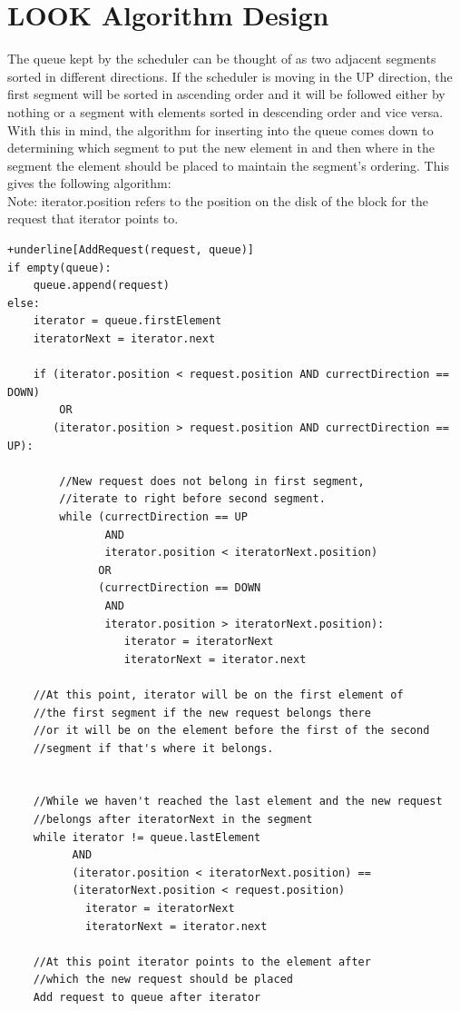 \documentclass[onecolumn,draftclsnofoot, 10pt, compsoc]{IEEEtran}
\begin{document}
\section{LOOK Algorithm Design}
	The queue kept by the scheduler can be thought of as two adjacent segments sorted in different directions. 
	If the scheduler is moving in the UP direction, the first segment will be sorted in ascending order and it will be followed either by nothing or a segment with elements sorted in descending order and vice versa.
	With this in mind, the algorithm for inserting into the queue comes down to determining which segment to put the new element in and then where in the segment the element should be placed to maintain the segment's ordering.
	This gives the following algorithm: \\

	Note: iterator.position refers to the position on the disk of the block for the request that iterator points to.

\begin{Verbatim}[commandchars=+\[\]]
+underline[AddRequest(request, queue)]
if empty(queue):
	queue.append(request)
else:
	iterator = queue.firstElement
	iteratorNext = iterator.next

	if (iterator.position < request.position AND currectDirection == DOWN)
		OR
	   (iterator.position > request.position AND currectDirection == UP):

		//New request does not belong in first segment, 
		//iterate to right before second segment.
		while (currectDirection == UP 
			   AND 
			   iterator.position < iteratorNext.position)
			  OR
			  (currectDirection == DOWN 
			   AND 
			   iterator.position > iteratorNext.position):
				  iterator = iteratorNext
				  iteratorNext = iterator.next

	//At this point, iterator will be on the first element of 
	//the first segment if the new request belongs there
	//or it will be on the element before the first of the second 
	//segment if that's where it belongs.


	//While we haven't reached the last element and the new request 
	//belongs after iteratorNext in the segment
	while iterator != queue.lastElement
		  AND
		  (iterator.position < iteratorNext.position) == 
		  (iteratorNext.position < request.position)
			iterator = iteratorNext
			iteratorNext = iterator.next

	//At this point iterator points to the element after 
	//which the new request should be placed
	Add request to queue after iterator
\end{Verbatim}
\end{document}
